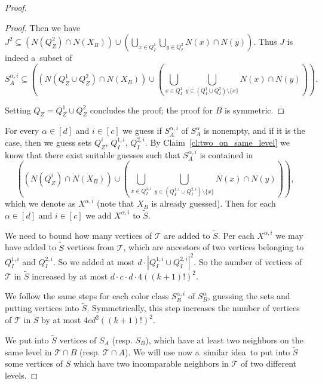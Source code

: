 \documentclass[11pt,a4paper]{article}
\theoremstyle{definition}
\def\T{\mathcal{T}}
\begin{document}
\begin{proof}
\begin{proof}
    Then we have $J^2\subseteq (N(Q_Z^2)\cap N(X_B)) \cup (\bigcup_{x\in Q_I^1}\bigcup_{y\in Q_I^2} N(x)\cap N(y))$. 
    Thus $J$ is indeed a~subset of 
    $$S_A^{\alpha, i} \subseteq \left(\left(N(Q_Z^1\cup Q_Z^2)\cap N(X_B) \right)\cup \left(\bigcup_{x\in Q_I^1}\bigcup_{y\in (Q_I^1\cup Q_I^2)\setminus \{x\}} N(x)\cap N(y)\right) \right).$$

    Setting $Q_Z = Q_Z^1 \cup Q_Z^2$ concludes the proof; the proof for $B$ is symmetric.
\end{proof} 

For every $\alpha\in[d]$ and $i\in[c]$ we guess if $S_A^{\alpha,i}$ of $S_A^\alpha$ is nonempty, and if it is the case, then we guess sets $Q_Z^{i}$, $Q_I^{1,i}$, $Q_I^{2,i}$. By Claim~\ref{cl:two_on_same_level} we know that there exist suitable guesses such that $S_A^{\alpha, i}$ is contained in
$$\left(\left(N(Q_Z^i)\cap N(X_B) \right)\cup \left(\bigcup_{x\in Q_I^{1,i}}\bigcup_{y\in (Q_I^{1,i}\cup Q_I^{2,i})\setminus \{x\}} N(x)\cap N(y)\right) \right),$$
which we denote as $X^{\alpha, i}$ (note that $X_B$ is already guessed). 
Then for each $\alpha\in[d]$ and $i\in[c]$ we add $X^{\alpha,i}$ to $\widetilde{S}$.

We need to bound how many vertices of $\T$ are added to $\widetilde{S}$. Per each $X^{\alpha, i}$ we may have added to $\widetilde{S}$ vertices from $\T$, which are ancestors of two vertices belonging to $Q_I^{1,i}$ and $Q_I^{2,i}$. So we added at most $d \cdot \left|Q_I^{1,i}\cup Q_I^{2,i}\right|^2$. So the number of vertices of $\T$ in $\widetilde{S}$ increased by at most $d \cdot c \cdot d \cdot 4((k+1)!)^2$.

We follow the same steps for each color class $S_B^{\alpha, i}$ of $S_B^\alpha$, guessing the sets and putting vertices into $\widetilde{S}$.
Symmetrically, this step increases the number of vertices of $\T$ in 
$\widetilde{S}$ by at most $4cd^2((k+1)!)^2$.

We put into $\widetilde{S}$ vertices of $S_A$ (resp. $S_B$), which have at least two neighbors on the same level in $\T\cap B$ (resp. $\T\cap A$). We will use now a~similar idea~to 
put into $\widetilde{S}$ some vertices of $S$ which have two incomparable neighbors in $\T$ of two different levels.


\end{proof}
\end{document}
